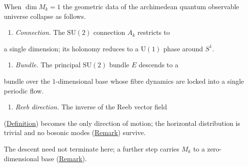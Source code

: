 \begin{remark}
  \label{rem:descent-reduction}
When $\dim M_k = 1$ the geometric data of the archimedean quantum observable
universe collapse as follows.

\begin{enumerate}
  \item \emph{Connection.}  The $\mathrm{SU}(2)$ connection $A_k$ restricts to
\end{enumerate}
   a single dimension; its holonomy reduces to a $\mathrm{U}(1)$ phase
   around $S^1$.
\begin{enumerate}
  \item \emph{Bundle.}  The principal $\mathrm{SU}(2)$ bundle $E$ descends to a
\end{enumerate}
   bundle over the $1$-dimensional base whose fibre dynamics are locked
   into a single periodic flow.
\begin{enumerate}
  \item \emph{Reeb direction.}  The inverse of the Reeb vector field
\end{enumerate}
   (\hyperref[def:q-reeb-vector-field]{Definition}) becomes the only direction
   of motion; the horizontal distribution is trivial and no bosonic modes
   (\hyperref[rem:algebraic-filter]{Remark}) survive.

The descent need not terminate here; a further step carries $M_k$ to a
zero-dimensional base (\hyperref[rem:descent-reduction-zero]{Remark}).
\end{remark}


